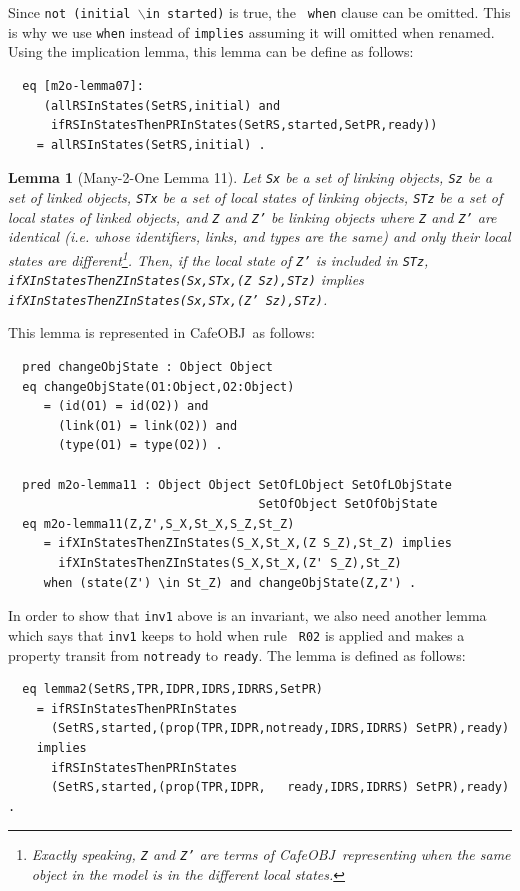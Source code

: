 \documentclass[12pt]{report}
\newtheorem{lemma}{Lemma}
\newcommand{\stt}[1]{{\small{\tt {#1}}}}
\newcommand{\cafeobj}{{\sf CafeOBJ}~}
\begin{document}
Since \stt{not (initial $\backslash$in started)} is true, the {\tt
  when} clause can be omitted. This is why we use {\tt when} instead
of {\tt implies} assuming it will omitted when renamed. Using the
implication lemma, this lemma can be define as follows:
\begin{verbatim}
  eq [m2o-lemma07]:
     (allRSInStates(SetRS,initial) and
      ifRSInStatesThenPRInStates(SetRS,started,SetPR,ready))
    = allRSInStates(SetRS,initial) .
\end{verbatim}

\begin{lemma}[Many-2-One Lemma 11]
  Let {\tt Sx} be a set of linking objects, {\tt Sz} be a set of
  linked objects, {\tt STx} be a set of local states of linking
  objects, {\tt STz} be a set of local states of linked objects, and
  {\tt Z} and {\tt Z'} be linking objects where {\tt Z} and {\tt Z'}
  are identical (i.e. whose identifiers, links, and types are the
  same) and only their local states are different\footnote{Exactly
    speaking, {\tt Z} and {\tt Z'} are terms of \cafeobj representing
    when the same object in the model is in the different local
    states.}.  Then, if the local state of {\tt Z'} is included in
  {\tt STz}, \stt{ifXInStatesThenZInStates(Sx,STx,(Z Sz),STz)}
  implies\\ \stt{ifXInStatesThenZInStates(Sx,STx,(Z' Sz),STz)}.
\end{lemma}
This lemma is represented in \cafeobj as follows:
\begin{verbatim}
  pred changeObjState : Object Object
  eq changeObjState(O1:Object,O2:Object)
     = (id(O1) = id(O2)) and 
       (link(O1) = link(O2)) and
       (type(O1) = type(O2)) .

  pred m2o-lemma11 : Object Object SetOfLObject SetOfLObjState
                                   SetOfObject SetOfObjState
  eq m2o-lemma11(Z,Z',S_X,St_X,S_Z,St_Z)
     = ifXInStatesThenZInStates(S_X,St_X,(Z S_Z),St_Z) implies
       ifXInStatesThenZInStates(S_X,St_X,(Z' S_Z),St_Z) 
     when (state(Z') \in St_Z) and changeObjState(Z,Z') .
\end{verbatim}
In order to show that {\tt inv1} above is an invariant, we also need
another lemma which says that {\tt inv1} keeps to hold when rule {\tt
  R02} is applied and makes a property transit from {\tt notready} to
{\tt ready}.  The lemma is defined as follows:
\begin{verbatim}
  eq lemma2(SetRS,TPR,IDPR,IDRS,IDRRS,SetPR)
    = ifRSInStatesThenPRInStates
      (SetRS,started,(prop(TPR,IDPR,notready,IDRS,IDRRS) SetPR),ready)
    implies
      ifRSInStatesThenPRInStates
      (SetRS,started,(prop(TPR,IDPR,   ready,IDRS,IDRRS) SetPR),ready) .
\end{verbatim}
\end{document}
